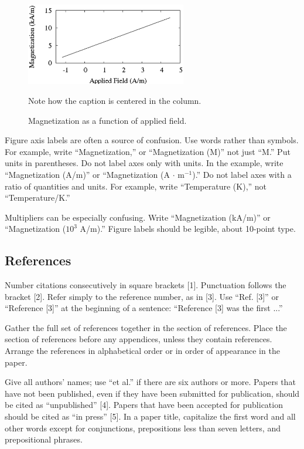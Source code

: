 \documentclass[conference,a4paper]{APSIPA2018}
\begin{document}
\begin{figure}[t]
\begin{center}
\includegraphics[width=70mm]{Fig1-Times-Roman.eps}
\end{center}
\caption{Magnetization as a function of applied field.}
\vspace*{-3pt}
{\hfill\footnotesize Note how the caption is centered in the column.\hfill}
\end{figure}

Figure axis labels are often a source of confusion. Use words rather
than symbols.  For example, write ``Magnetization,'' or
``Magnetization (M)'' not just ``M.''  Put units in parentheses.  Do
not label axes only with units.  In the example, write ``Magnetization
(A/m)'' or ``Magnetization (A $\cdot$ m$^{-1}$).''  Do not label axes
with a ratio of quantities and units.  For example, write
``Temperature (K),'' not ``Temperature/K.''

Multipliers can be especially confusing.  Write ``Magnetization
(kA/m)'' or ``Magnetization ($10^3$ A/m).''  Figure labels should be
legible, about 10-point type.

\subsection{References}
Number citations consecutively in square brackets [1].  Punctuation
follows the bracket [2]. Refer simply to the reference number, as in
[3]. Use ``Ref. [3]'' or ``Reference [3]'' at the beginning of a
sentence: ``Reference [3] was the first ...''


Gather the full set of references together in the section of
references.  Place the section of references before any appendices,
unless they contain references.  Arrange the references in
alphabetical order or in order of appearance in the paper.

Give all authors' names; use ``et al.''  if there are six authors or
more.  Papers that have not been published, even if they have been
submitted for publication, should be cited as ``unpublished'' [4].
Papers that have been accepted for publication should be cited as ``in
press'' [5].  In a paper title, capitalize the first word and all
other words except for conjunctions, prepositions less than seven
letters, and prepositional phrases.
\end{document}
